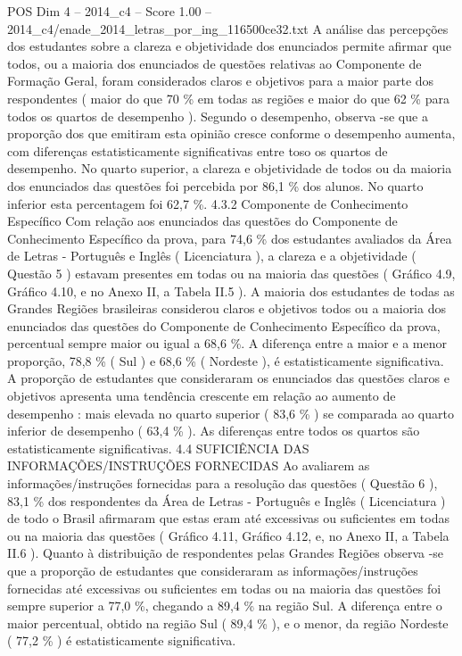 \begin{textsample}{POS Dim 4 – 2014\_c4 – Score 1.00 – 2014\_c4/enade\_2014\_letras\_por\_ing\_116500ce32.txt}
A análise das percepções dos estudantes sobre a clareza e objetividade dos enunciados permite afirmar que todos, ou a maioria dos enunciados de questões relativas ao Componente de Formação Geral, foram considerados claros e objetivos para a maior parte dos respondentes ( maior do que 70 \% em todas as regiões e maior do que 62 \% para todos os quartos de desempenho ).
Segundo o desempenho, observa -se que a proporção dos que emitiram esta opinião cresce conforme o desempenho aumenta, com diferenças estatisticamente significativas entre toso os quartos de desempenho.
No quarto superior, a clareza e objetividade de todos ou da maioria dos enunciados das questões foi percebida por 86,1 \% dos alunos.
No quarto inferior esta percentagem foi 62,7 \%. 4.3.2 Componente de Conhecimento Específico Com relação aos enunciados das questões do Componente de Conhecimento Específico da prova, para 74,6 \% dos estudantes avaliados da Área de Letras - Português e Inglês ( Licenciatura ), a clareza e a objetividade ( Questão 5 ) estavam presentes em todas ou na maioria das questões ( Gráfico 4.9, Gráfico 4.10, e no Anexo II, a Tabela II.5 ).
A maioria dos estudantes de todas as Grandes Regiões brasileiras considerou claros e objetivos todos ou a maioria dos enunciados das questões do Componente de Conhecimento Específico da prova, percentual sempre maior ou igual a 68,6 \%.
A diferença entre a maior e a menor proporção, 78,8 \% ( Sul ) e 68,6 \% ( Nordeste ), é estatisticamente significativa.
A proporção de estudantes que consideraram os enunciados das questões claros e objetivos apresenta uma tendência crescente em relação ao aumento de desempenho : mais elevada no quarto superior ( 83,6 \% ) se comparada ao quarto inferior de desempenho ( 63,4 \% ).
As diferenças entre todos os quartos são estatisticamente significativas. 4.4 SUFICIÊNCIA DAS INFORMAÇÕES/INSTRUÇÕES FORNECIDAS Ao avaliarem as informações/instruções fornecidas para a resolução das questões ( Questão 6 ), 83,1 \% dos respondentes da Área de Letras - Português e Inglês ( Licenciatura ) de todo o Brasil afirmaram que estas eram até excessivas ou suficientes em todas ou na maioria das questões ( Gráfico 4.11, Gráfico 4.12, e, no Anexo II, a Tabela II.6 ).
Quanto à distribuição de respondentes pelas Grandes Regiões observa -se que a proporção de estudantes que consideraram as informações/instruções fornecidas até excessivas ou suficientes em todas ou na maioria das questões foi sempre superior a 77,0 \%, chegando a 89,4 \% na região Sul.
A diferença entre o maior percentual, obtido na região Sul ( 89,4 \% ), e o menor, da região Nordeste ( 77,2 \% ) é estatisticamente significativa.

\end{textsample}
